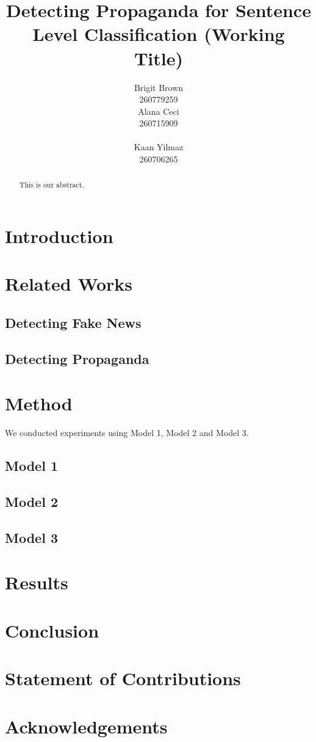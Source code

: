 \documentclass[11pt]{article}
\title{Detecting Propaganda for Sentence Level Classification (Working Title)}
\author{Brigit Brown \\
260779259 \\\And
 Alana Ceci \\
  260715909 \\
  \\\And
  Kaan Yilmaz \\
  260706265}
\date{}
\begin{document}
\maketitle
\begin{abstract}
  This is our abstract.
\end{abstract}

\section{Introduction}




\section{Related Works}

\subsection{Detecting Fake News}



\subsection{Detecting Propaganda}




\section{Method}
We conducted experiments using Model 1, Model 2 and Model 3.

\subsection{Model 1}
\subsection{Model 2}
\subsection{Model 3}



\section{Results}



\section{Conclusion}



\section*{Statement of Contributions}

\section* {Acknowledgements}


%
%



\end{document}
